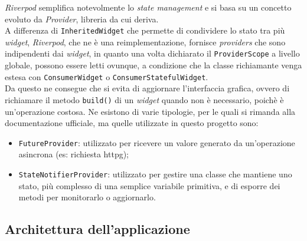 \emph{Riverpod} semplifica notevolmente lo \emph{state management} e si basa su un concetto evoluto da \emph{Provider}\cite{site:provider}, libreria da cui deriva.\\
A differenza di \lstinline{InheritedWidget}\cite{site:inheritw} che permette di condividere lo stato tra più \emph{widget}, \emph{Riverpod}, che ne è una reimplementazione, fornisce \emph{providers} che sono indipendenti dai \emph{widget}, in quanto una volta dichiarato il \lstinline{ProviderScope} a livello globale, possono essere letti ovunque, a condizione che la classe richiamante venga estesa con \lstinline{ConsumerWidget} o \lstinline{ConsumerStatefulWidget}\cite{site:reading-provider}. \\
Da questo ne consegue che si evita di aggiornare l'interfaccia grafica, ovvero di richiamare il metodo \lstinline{build()} di un \emph{widget} quando non è necessario, poichè è un'operazione costosa.
Ne esistono di varie tipologie, per le quali si rimanda alla documentazione ufficiale\cite{site:riverpod}, ma quelle utilizzate in questo progetto sono:
\begin{itemize}
    \item \lstinline{FutureProvider}\cite{site:future-provider}: utilizzato per ricevere un valore generato da un'operazione asincrona (es: richiesta \gls{httpg}\glsoccur);
    \item \lstinline{StateNotifierProvider}\cite{site:state-notifier-provider}: utilizzato per gestire una classe che mantiene uno stato, più complesso di una semplice variabile primitiva, e di esporre dei metodi per monitorarlo o aggiornarlo.
\end{itemize}

\subsection{Architettura dell'applicazione}
\label{subsec:architettura-app}


